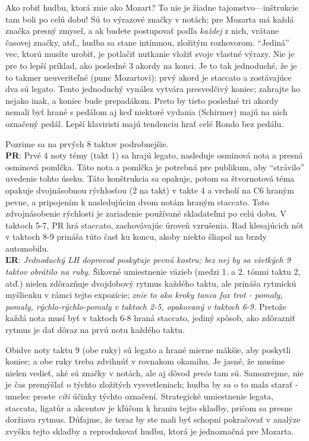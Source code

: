 Ako robiť hudbu, ktorá znie ako Mozart? To nie je žiadne tajomstvo—inštrukcie tam boli po celú dobu! Sú to výrazové značky v notách; pre Mozarta má každá značka presný zmysel, a ak budete postupovať podľa \textit{každej} z nich, vrátane časovej značky, atď., hudba sa stane intímnou, zložitým rozhovorom. “Jediná” vec, ktorú musíte urobiť, je potlačiť nutkanie vložiť svoje vlastné výrazy. Nie je pre to lepší príklad, ako posledné 3 akordy na konci. Je to tak jednoduché, že je to takmer neuveriteľné (punc Mozartovi): prvý akord je staccato a zostávajúce dva sú legato. Tento jednoduchý vynález vytvára presvedčivý koniec; zahrajte ho nejako inak, a koniec bude prepadákom. Preto by tieto posledné tri akordy nemali byť hrané s pedálom aj keď niektoré vydania (Schirmer) majú na nich označený pedál. Lepší klaviristi majú tendenciu hrať celé Rondo bez pedálu.

Pozrime sa na prvých 8 taktov podrobnejšie.\\
\textbf{PR}: Prvé 4 noty témy (takt 1) sa hrajú legato, nasleduje osminová nota a presná osminová pomlčka. Táto nota a pomlčka je potrebná pre publikum, aby “strávilo” uvedenie tohto úseku. Táto konštrukcia sa opakuje, potom sa štvornotová téma opakuje dvojnásobnou rýchlosťou (2 na takt) v takte 4 a vrcholí na C6 hraným pevne, a pripojením k nasledujúcim dvom notám hraným staccato. Toto zdvojnásobenie rýchlosti je zariadenie používané skladateľmi po celú dobu. V taktoch 5-7, PR hrá staccato, zachovávajúc úroveň vzrušenia. Rad klesajúcich nôt v taktoch 8-9 prináša túto časť ku koncu, akoby niekto šliapol na brzdy automobilu.\\
\textbf{ĽR}: \emph{Jednoduchý LH doprovod poskytuje pevnú kostru; bez nej by sa všetkých 9 taktov obrátilo na ruby.} Šikovné umiestnenie väzieb (medzi 1. a 2. tónmi taktu 2, atď.) nielen zdôrazňuje dvojdobový rytmus každého taktu, ale prináša rytmickú myšlienku v rámci tejto expozície; \emph{znie to ako kroky tanca fox trot - pomaly, pomaly, rýchlo-rýchlo-pomaly v taktoch 2-5, opakovaný v taktoch 6-9.} Pretože každá nota musí byť v taktoch 6-8 hraná staccato, jediný spôsob, ako zdôrazniť rytmus je dať dôraz na prvú notu každého taktu.

Obidve noty taktu 9 (obe ruky) sú legato a hrané mierne mäkšie, aby poskytli koniec; a obe ruky treba zdvihnúť v rovnakom okamihu. Je jasné, že musíme nielen vedieť, aké sú značky v notách, ale aj dôvod \textit{prečo} tam sú. Samozrejme, nie je čas premýšľať o týchto zložitých vysvetleniach; hudba by sa o to mala starať - umelec proste \textit{cíti} účinky týchto označení. Strategické umiestnenie legata, staccata, ligatúr a akcentov je kľúčom k hraniu tejto skladby, pričom sa presne doržiava rytmus. Dúfajme, že teraz by ste mali byť schopní pokračovať v analýze zvyšku tejto skladby a reprodukovať hudbu, ktorá je jednoznačná pre Mozarta.

